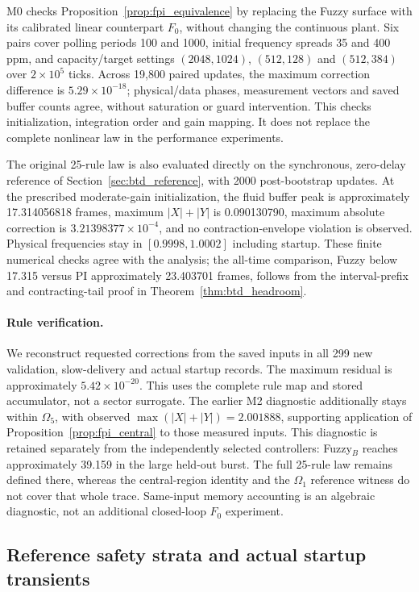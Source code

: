 M0 checks Proposition~\ref{prop:fpi_equivalence} by replacing the Fuzzy
surface with its calibrated linear counterpart $F_0$, without changing
the continuous plant. Six pairs cover polling periods 100 and 1000,
initial frequency spreads 35 and 400 ppm, and capacity/target settings
$(2048,1024)$, $(512,128)$ and $(512,384)$ over $2\times10^5$ ticks.
Across 19,800 paired updates, the maximum correction difference is
$5.29\times10^{-18}$; physical/data phases, measurement vectors and
saved buffer counts agree, without saturation or guard intervention.
This checks initialization, integration order and gain mapping. It does
not replace the complete nonlinear law in the performance experiments.

The original 25-rule law is also evaluated directly on the synchronous,
zero-delay reference of Section~\ref{sec:btd_reference}, with 2000
post-bootstrap updates. At the prescribed moderate-gain initialization,
the fluid buffer peak is approximately 17.314056818 frames, maximum
$|X|+|Y|$ is 0.090130790, maximum absolute correction is
$3.21398377\times10^{-4}$, and no contraction-envelope violation is
observed. Physical frequencies stay in $[0.9998,1.0002]$ including
startup. These finite numerical checks agree with the analysis; the
all-time comparison, Fuzzy below 17.315 versus PI approximately
23.403701 frames, follows from the interval-prefix and contracting-tail
proof in Theorem~\ref{thm:btd_headroom}.

\paragraph{Rule verification.}
We reconstruct requested corrections from the saved inputs in all 299
new validation, slow-delivery and actual startup records. The maximum
residual is approximately $5.42\times10^{-20}$. This uses the complete
rule map and stored accumulator, not a sector surrogate. The earlier
M2 diagnostic additionally stays within $\Omega_5$, with observed
$\max(|X|+|Y|)=2.001888$, supporting application of
Proposition~\ref{prop:fpi_central} to those measured inputs. This
diagnostic is retained separately from the independently selected
controllers: Fuzzy$_B$ reaches approximately 39.159 in the large
held-out burst. The full 25-rule law remains defined there, whereas
the central-region identity and the $\Omega_1$ reference witness do
not cover that whole trace. Same-input memory accounting is an
algebraic diagnostic, not an additional closed-loop $F_0$ experiment.

\subsection{Reference safety strata and actual startup transients}
\label{subsec:eval_safety}

